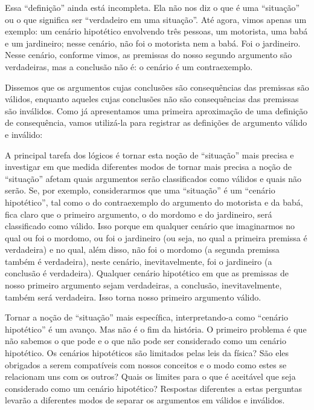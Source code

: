 Essa ``definição'' ainda está incompleta. Ela não nos diz o que é uma ``situação'' ou o que significa ser ``verdadeiro em uma situação''.
Até agora, vimos apenas um exemplo:
um cenário hipotético envolvendo três pessoas, um motorista, uma babá e um jardineiro; nesse cenário, não foi o motorista nem a babá. Foi o jardineiro. Nesse cenário, conforme vimos, as premissas do nosso segundo argumento são verdadeiras, mas a conclusão não é:
o cenário é um contraexemplo.

Dissemos que os argumentos cujas conclusões são consequências das premissas são válidos, enquanto aqueles cujas conclusões não são consequências das premissas são inválidos.
Como já apresentamos uma primeira aproximação de uma definição de consequência, vamos utilizá-la para registrar as definições de argumento válido e inválido:



A principal tarefa dos lógicos é tornar esta noção de ``situação'' mais precisa e investigar em que medida diferentes modos de tornar mais precisa a noção de ``situação'' afetam quais argumentos serão classificados como válidos e quais não serão. 
Se, por exemplo, considerarmos que uma ``situação'' é um ``cenário hipotético'', tal como o do contraexemplo do argumento do motorista e da babá, fica claro que o primeiro argumento, o do mordomo e do jardineiro, será classificado como válido.
Isso porque em qualquer cenário que imaginarmos no qual ou foi o mordomo, ou foi o jardineiro (ou seja, no qual a primeira premissa é verdadeira) e no qual, além disso, não foi o mordomo (a segunda premissa também é verdadeira), neste cenário, inevitavelmente, foi o jardineiro (a conclusão é verdadeira).
Qualquer cenário hipotético em que as premissas de nosso primeiro argumento sejam verdadeiras, a conclusão, inevitavelmente, também será verdadeira.
Isso torna nosso primeiro argumento válido.

Tornar a noção de ``situação'' mais específica, interpretando-a como ``cenário hipotético'' é um avanço.
Mas não é o fim da história.
O primeiro problema é que não sabemos o que pode e o que não pode ser considerado como um cenário hipotético.
Os cenários hipotéticos são limitados pelas leis da física?
São eles obrigados a serem compatíveis com nossos conceitos e o modo como estes se relacionam uns com os outros?
Quais os limites para o que é aceitável que seja considerado como um cenário hipotético?
Respostas diferentes a estas perguntas levarão a diferentes modos de separar os argumentos em válidos e inválidos.

